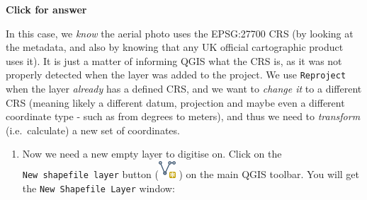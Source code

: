 \documentclass[
  letterpaper,
  DIV=11,
  numbers=noendperiod]{scrreprt}
\providecommand{\tightlist}{%
  \setlength{\itemsep}{0pt}\setlength{\parskip}{0pt}}\usepackage{longtable,booktabs,array}
\begin{document}
\begin{tcolorbox}[enhanced jigsaw, toprule=.15mm, breakable, left=2mm, colframe=quarto-callout-important-color-frame, colback=white, arc=.35mm, leftrule=.75mm, opacityback=0, rightrule=.15mm, bottomrule=.15mm]

\vspace{-3mm}\textbf{Click for answer}\vspace{3mm}

In this case, we \emph{know} the aerial photo uses the EPSG:27700 CRS
(by looking at the metadata, and also by knowing that any UK official
cartographic product uses it). It is just a matter of informing QGIS
what the CRS is, as it was not properly detected when the layer was
added to the project. We use \texttt{Reproject} when the layer
\emph{already} has a defined CRS, and we want to \emph{change it} to a
different CRS (meaning likely a different datum, projection and maybe
even a different coordinate type - such as from degrees to meters), and
thus we need to \emph{transform} (i.e.~calculate) a new set of
coordinates.

\end{tcolorbox}

\begin{enumerate}
\def\labelenumi{(\arabic{enumi})}
\setcounter{enumi}{221}
\tightlist
\item
  Now we need a new empty layer to digitise on. Click on the
  \texttt{New\ shapefile\ layer} button
  (\includegraphics{index_files/mediabag/mActionNewVectorLaye.png} ) on
  the main QGIS toolbar. You will get the \texttt{New\ Shapefile\ Layer}
  window:
\end{enumerate}
\end{document}
